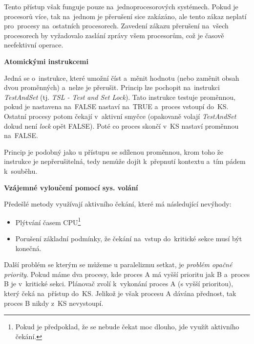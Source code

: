 \vspace{0,5cm}

Tento přístup však funguje pouze na~jednoprocesorových systémech. Pokud je procesorů více, tak na~jednom je přerušení sice zakázáno, ale tento zákaz neplatí pro~procesy na~ostatních procesorech. Zavedení zákazu přerušení na~všech procesorech by vyžadovalo zaslání zprávy všem procesorům, což je časově neefektivní operace. 

\begin{large}
    \vspace{0,5cm}
    \textbf{Atomickými instrukcemi}    
\end{large}

Jedná se o~instrukce, které umožní číst a~měnit hodnotu (nebo zaměnit obsah dvou proměnných) a~nelze je přerušit. Princip lze pochopit na~instrukci \emph{TestAndSet} (tj. \emph{TSL - Test and Set Lock}). Tato instrukce testuje proměnnou, pokud je nastavena na~FALSE nastaví na~TRUE a~proces vstoupí do~KS. Ostatní procesy potom čekají v~aktivní smyčce (opakovaně volají \emph{TestAndSet} dokud není \emph{lock} opět FALSE). Poté co proces skončí v~KS nastaví proměnnou na~FALSE. 

\vspace{0,5cm}

Princip je podobný jako u přístupu se sdílenou proměnnou, krom toho že instrukce je nepřerušitelná, tedy nemůže dojít k~přepnutí kontextu a~tím pádem k~souběhu. 

\begin{large}
    \vspace{0,5cm}
    \textbf{Vzájemné vyloučení pomocí sys. volání}    
\end{large}

Předešlé metody využívají aktivního čekání, které má následující nevýhody:
\begin{itemize}
    \item Plýtvání časem CPU\footnote{Pokud je předpoklad, že se nebude čekat moc dlouho, jde využít aktivního čekání.}
    \item Porušení základní podmínky, že čekání na~vstup do~kritické sekce musí být konečná.
\end{itemize}

Další problém se kterým se můžeme u paralelizmu setkat, je \emph{problém opačné priority}. Pokud máme dva procesy, kde proces A má vyšší prioritu jak B a~proces B je v~kritické sekci. Plánovač zvolí k~vykonání proces A (s vyšší prioritou), který čeká na~přístup do~KS. Jelikož je však procesu A dávána přednost, tak proces B nikdy z~KS nevystoupí. 

